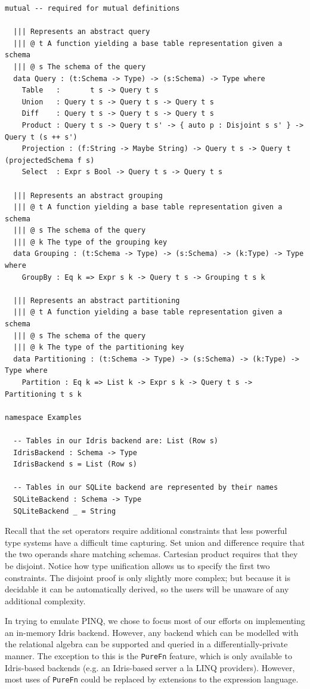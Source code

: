 \documentclass[12pt]{report}
\begin{document}
\begin{lstlisting}[caption={Representing queries},label={lst:queries}]
mutual -- required for mutual definitions

  ||| Represents an abstract query
  ||| @ t A function yielding a base table representation given a schema
  ||| @ s The schema of the query
  data Query : (t:Schema -> Type) -> (s:Schema) -> Type where
    Table   :       t s -> Query t s
    Union   : Query t s -> Query t s -> Query t s
    Diff    : Query t s -> Query t s -> Query t s
    Product : Query t s -> Query t s' -> { auto p : Disjoint s s' } -> Query t (s ++ s')
    Projection : (f:String -> Maybe String) -> Query t s -> Query t (projectedSchema f s)
    Select  : Expr s Bool -> Query t s -> Query t s

  ||| Represents an abstract grouping
  ||| @ t A function yielding a base table representation given a schema
  ||| @ s The schema of the query
  ||| @ k The type of the grouping key
  data Grouping : (t:Schema -> Type) -> (s:Schema) -> (k:Type) -> Type where
    GroupBy : Eq k => Expr s k -> Query t s -> Grouping t s k

  ||| Represents an abstract partitioning
  ||| @ t A function yielding a base table representation given a schema
  ||| @ s The schema of the query
  ||| @ k The type of the partitioning key
  data Partitioning : (t:Schema -> Type) -> (s:Schema) -> (k:Type) -> Type where
    Partition : Eq k => List k -> Expr s k -> Query t s -> Partitioning t s k

namespace Examples

  -- Tables in our Idris backend are: List (Row s)
  IdrisBackend : Schema -> Type
  IdrisBackend s = List (Row s)

  -- Tables in our SQLite backend are represented by their names
  SQLiteBackend : Schema -> Type
  SQLiteBackend _ = String
\end{lstlisting}

Recall that the set operators require additional constraints that less powerful type systems have a difficult time capturing.
Set union and difference require that the two operands share matching schemas.
Cartesian product requires that they be disjoint.
Notice how type unification allows us to specify the first two constraints.
The disjoint proof is only slightly more complex; but because it is decidable it can be automatically derived, so the users will be unaware of any additional complexity.

In trying to emulate PINQ, we chose to focus most of our efforts on implementing an in-memory Idris backend.
However, any backend which can be modelled with the relational algebra can be supported and queried in a differentially-private manner.
The exception to this is the \texttt{PureFn} feature, which is only available to Idris-based backends (e.g. an Idris-based server a la LINQ providers).
However, most uses of \texttt{PureFn} could be replaced by extensions to the expression language.
\end{document}
